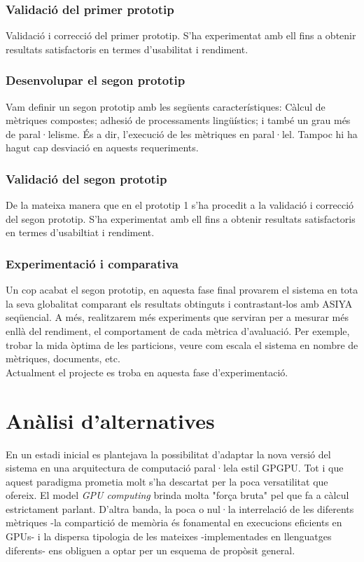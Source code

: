 \documentclass[11pt,a4paper]{article}
\begin{document}
\subsubsection{Validació del primer prototip}
Validació i correcció del primer prototip. S'ha experimentat amb  ell fins a obtenir resultats satisfactoris en termes d'usabilitat i rendiment.

\subsubsection{Desenvolupar el segon prototip}
Vam definir un segon prototip amb les següents característiques: Càlcul de mètriques compostes; adhesió de processaments lingüístics; i també un grau més de paral·lelisme. És a dir, l'execució de les mètriques en paral·lel. Tampoc hi ha hagut cap desviació en aquests requeriments.

\subsubsection{Validació del segon prototip}
De la mateixa manera que en el prototip 1 s'ha procedit a la validació i correcció del segon prototip. S’ha experimentat amb  ell fins a obtenir resultats satisfactoris en termes d'usabiltiat i  rendiment.

\subsubsection{Experimentació i comparativa}
Un cop acabat el segon prototip, en aquesta fase final provarem el sistema en tota la seva globalitat comparant els resultats obtinguts i contrastant-los amb ASIYA seqüencial. A més, realitzarem més experiments que serviran per a mesurar més enllà del rendiment, el comportament de cada mètrica d'avaluació. Per exemple, trobar la mida òptima de les particions, veure com escala el sistema en nombre de mètriques, documents, etc.
\\

Actualment el projecte es troba en aquesta fase d'experimentació.

\newpage
\section{Anàlisi d'alternatives}
En un estadi inicial es plantejava la possibilitat d'adaptar la nova versió del sistema en una arquitectura de computació paral·lela estil GPGPU. Tot i que aquest paradigma prometia molt s'ha descartat per la poca versatilitat que ofereix. El model \textit{GPU computing} brinda molta "força bruta" pel que fa a càlcul estrictament parlant. D'altra banda, la poca o nul·la interrelació de les diferents mètriques -la compartició de memòria és fonamental en execucions eficients en GPUs- i la dispersa tipologia de les mateixes -implementades en llenguatges diferents- ens obliguen a optar per un esquema de propòsit general. 
\\
\end{document}

